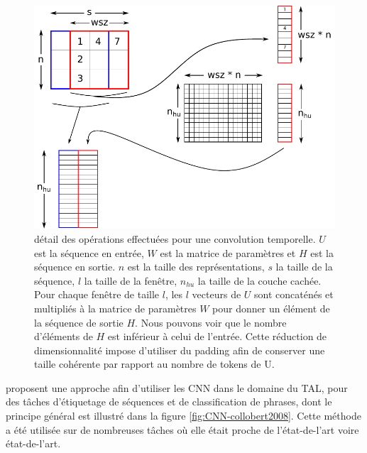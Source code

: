 \documentclass[12pt,a4paper,times,twoside,openright]{report}
\begin{document}
\begin{figure}[ht!]
    \centering
    \includegraphics[scale=0.8]{images/NN/convnet}
    \caption{détail des opérations effectuées pour une convolution temporelle. $U$ est la séquence en entrée, $W$ est la matrice de paramètres et $H$ est la séquence en sortie. $n$ est la taille des représentations, $s$ la taille de la séquence, $l$ la taille de la fenêtre, $n_{hu}$ la taille de la couche cachée. Pour chaque fenêtre de taille $l$, les $l$ vecteurs de $U$ sont concaténés et multipliés à la matrice de paramètres $W$ pour donner un élément de la séquence de sortie $H$. Nous pouvons voir que le nombre d'éléments de $H$ est inférieur à celui de l'entrée. Cette réduction de dimensionnalité impose d'utiliser du padding afin de conserver une taille cohérente par rapport au nombre de tokens de U.}
    \label{fig:CNN-detail}
\end{figure}

\citet{collobert2008unified} proposent une approche afin d'utiliser les CNN dans le domaine du TAL, pour des tâches d'étiquetage de séquences et de classification de phrases, dont le principe général est illustré dans la figure \ref{fig:CNN-collobert2008}. Cette méthode a été utilisée sur de nombreuses tâches où elle était proche de l'état-de-l'art voire état-de-l'art.
\end{document}
